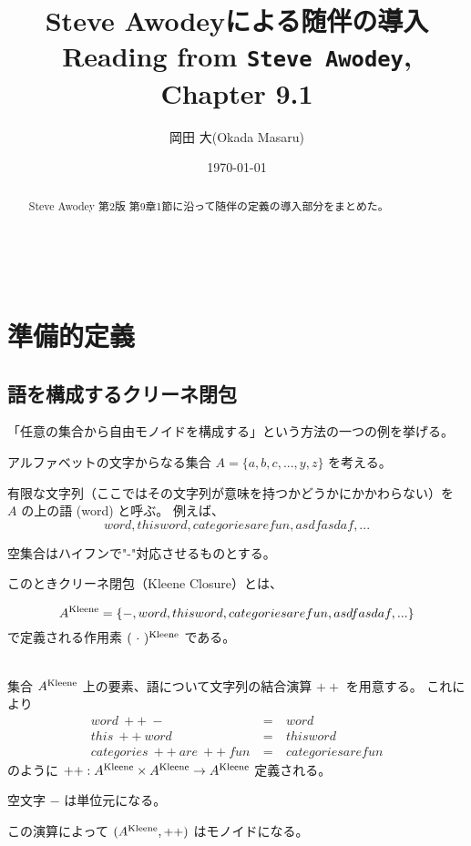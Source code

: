 \documentclass[uplatex,a4j,12pt,dvipdfmx]{jsarticle}
\title{
Steve Awodeyによる随伴の導入 \\
    \normalsize Reading from \texttt{Steve Awodey}, Chapter 9.1
}
\author{岡田 大(Okada Masaru)}
\date{\today}
\begin{document}
\maketitle

\begin{abstract}
	Steve Awodey 第2版 第9章1節に沿って随伴の定義の導入部分をまとめた\cite{Awodey}。
\end{abstract}

\tableofcontents

\ \\

\section{準備的定義}

\subsection{語を構成するクリーネ閉包}

「任意の集合から自由モノイドを構成する」という方法の一つの例を挙げる。

アルファベットの文字からなる集合 $A = \{ a,b,c,...,y,z \}$ を考える。

有限な文字列（ここではその文字列が意味を持つかどうかにかかわらない）を $A$ の上の語 (word) と呼ぶ。
例えば、
$$
	word, thisword, categoriesarefun, asdfasdaf, ...
$$

空集合はハイフンで"-"対応させるものとする。

このときクリーネ閉包（Kleene Closure）とは、

$$
	A^{\rm Kleene} = \{ -, word, thisword, categoriesarefun, asdfasdaf, ... \}
$$
で定義される作用素 $( \ \cdot \ )^{\rm Kleene}$ である。

\ \\

集合 $A^{\rm Kleene}$ 上の要素、語について文字列の結合演算 $++$ を用意する。
これにより
\[
	\begin{array}{rcl}
		word \ ++ \ - \                     & = & \ word             \\
		this \ ++ \ word \                  & = & \ thisword         \\
		categories \ ++ \ are \ ++ \ fun \  & = & \ categoriesarefun
	\end{array}
\]
のように $++ : A^{\rm Kleene} \times A^{\rm Kleene} \to A^{\rm Kleene}$ 定義される。

空文字 $-$ は単位元になる。

この演算によって $(A^{\rm Kleene}, ++)$ はモノイドになる。
\end{document}

